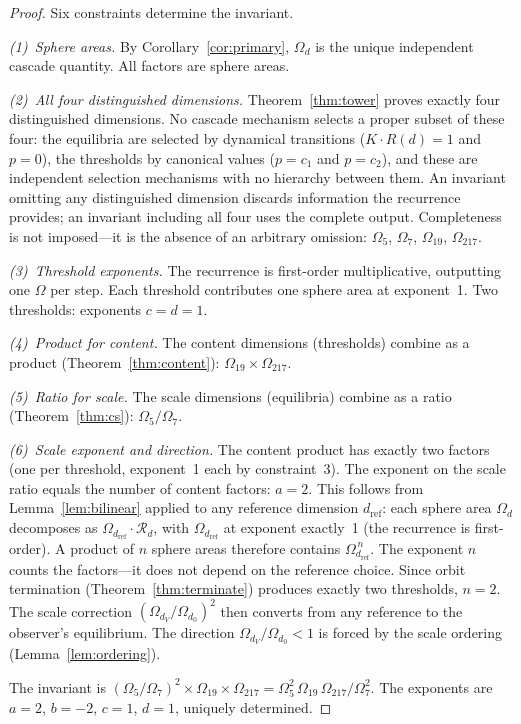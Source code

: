 \documentclass[11pt,a4paper]{article}
\begin{document}
\begin{proof}
Six constraints determine the invariant.

\emph{(1)~Sphere areas.} By Corollary~\ref{cor:primary}, $\Omega_d$ is the
unique independent cascade quantity. All factors are sphere areas.

\emph{(2)~All four distinguished dimensions.}
Theorem~\ref{thm:tower} proves exactly four distinguished dimensions.
No cascade mechanism selects a proper subset of these four: the equilibria
are selected by dynamical transitions ($K\cdot R(d) = 1$ and $p = 0$),
the thresholds by canonical values ($p = c_1$ and $p = c_2$), and these
are independent selection mechanisms with no hierarchy between them.
An invariant omitting any distinguished dimension discards information the
recurrence provides; an invariant including all four uses the complete
output. Completeness is not imposed---it is the absence of an arbitrary
omission: $\Omega_5$, $\Omega_7$, $\Omega_{19}$, $\Omega_{217}$.

\emph{(3)~Threshold exponents.} The recurrence is first-order
multiplicative, outputting one $\Omega$ per step. Each threshold
contributes one sphere area at exponent~1. Two thresholds: exponents
$c = d = 1$.

\emph{(4)~Product for content.} The content dimensions (thresholds) combine
as a product (Theorem~\ref{thm:content}):
$\Omega_{19}\times\Omega_{217}$.

\emph{(5)~Ratio for scale.} The scale dimensions (equilibria) combine as a
ratio (Theorem~\ref{thm:cs}): $\Omega_5/\Omega_7$.

\emph{(6)~Scale exponent and direction.} The content product has exactly
two factors (one per threshold, exponent~1 each by constraint~3).
The exponent on the scale ratio equals the number of content factors:
$a = 2$.  This follows from Lemma~\ref{lem:bilinear} applied to any
reference dimension $d_{\mathrm{ref}}$: each sphere area $\Omega_d$
decomposes as $\Omega_{d_{\mathrm{ref}}}\cdot\mathcal{R}_d$, with
$\Omega_{d_{\mathrm{ref}}}$ at exponent exactly~1 (the recurrence is
first-order). A product of $n$ sphere areas therefore contains
$\Omega_{d_{\mathrm{ref}}}^{\,n}$. The exponent $n$ counts the
factors---it does not depend on the reference choice. Since orbit
termination (Theorem~\ref{thm:terminate}) produces exactly two thresholds,
$n = 2$.  The scale correction
$(\Omega_{d_V}/\Omega_{d_0})^2$ then converts from any reference to the
observer's equilibrium. The direction
$\Omega_{d_V}/\Omega_{d_0} < 1$ is forced by the scale ordering
(Lemma~\ref{lem:ordering}).

The invariant is $(\Omega_5/\Omega_7)^2\times\Omega_{19}\times\Omega_{217}
= \Omega_5^2\,\Omega_{19}\,\Omega_{217}/\Omega_7^2$. The exponents are
$a = 2$, $b = -2$, $c = 1$, $d = 1$, uniquely determined.
\end{proof}
\end{document}
